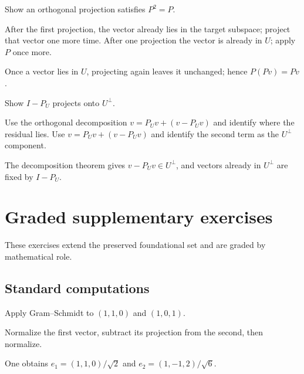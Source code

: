 \begin{exercise}\label{exr:i14-07}
Show an orthogonal projection satisfies $P^2=P$.
\end{exercise}
\begin{hint}
After the first projection, the vector already lies in the target subspace; project that vector one more time. After one projection the vector is already in \(U\); apply \(P\) once more.
\end{hint}
\begin{solution}
Once a vector lies in $U$, projecting again leaves it unchanged; hence $P(Pv)=Pv$.
\end{solution}

\begin{exercise}\label{exr:i14-08}
Show $I-P_U$ projects onto $U^\perp$.
\end{exercise}
\begin{hint}
Use the orthogonal decomposition \(v=P_Uv+(v-P_Uv)\) and identify where the residual lies. Use \(v=P_Uv+(v-P_Uv)\) and identify the second term as the \(U^\perp\) component.
\end{hint}
\begin{solution}
The decomposition theorem gives $v-P_Uv\in U^\perp$, and vectors already in $U^\perp$ are fixed by $I-P_U$.
\end{solution}


\section{Graded supplementary exercises}
These exercises extend the preserved foundational set and are graded by mathematical role.

\subsection*{Standard computations}

\begin{exercise}\label{exr:i14-expand-01}
Apply Gram--Schmidt to \((1,1,0)\) and \((1,0,1)\).
\end{exercise}
\begin{hint}
Normalize the first vector, subtract its projection from the second, then normalize.
\end{hint}
\begin{solution}
One obtains \(e_1=(1,1,0)/\sqrt2\) and \(e_2=(1,-1,2)/\sqrt6\).
\end{solution}

